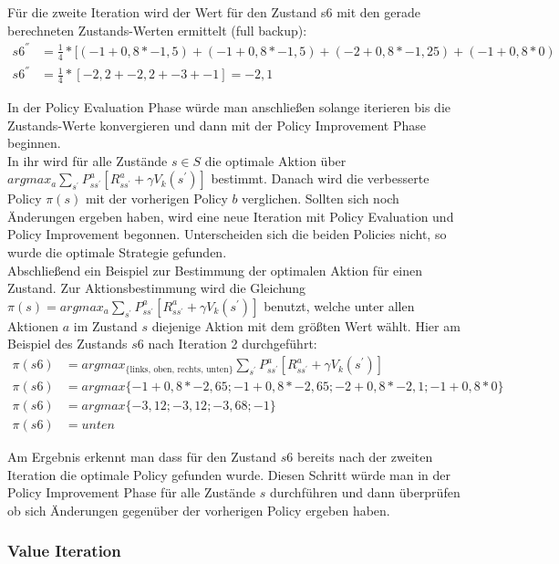 \documentclass[10pt]{scrartcl}
\begin{document}
Für die zweite Iteration wird der Wert für den Zustand s6 mit den gerade berechneten Zustands-Werten ermittelt (full backup):
\begin{align}
	s6^{''} &= \frac{1}{4} * [(-1 + 0,8 * -1,5) + (-1 + 0,8 * -1,5) + (-2 + 0,8 * -1,25) + (-1 + 0,8 * 0)\\
	s6^{''} &= \frac{1}{4} * [ -2,2 + -2,2 + -3 + -1 ] = -2,1
\end{align}

In der Policy Evaluation Phase würde man anschließen solange iterieren bis die Zustands-Werte konvergieren und dann mit der Policy Improvement Phase beginnen.\\
In ihr wird für alle Zustände $s \in S$ die optimale Aktion über 
$argmax_{a} \sum_{s^{'}} P^a_{ss^{'}} [R^a_{ss^{'}} + \gamma V_{k} (s^{'})]$ bestimmt. 
Danach wird die verbesserte Policy $\pi(s)$ mit der vorherigen Policy $b$ verglichen.
Sollten sich noch Änderungen ergeben haben, wird eine neue Iteration mit Policy Evaluation und Policy Improvement begonnen.
Unterscheiden sich die beiden Policies nicht, so wurde die optimale Strategie gefunden.\\

Abschließend ein Beispiel zur Bestimmung der optimalen Aktion für einen Zustand. Zur Aktionsbestimmung wird die Gleichung $\pi(s) = argmax_{a} \sum_{s^{'}} P^a_{ss^{'}} [R^a_{ss^{'}} + \gamma V_{k} (s^{'})]$ benutzt, welche unter allen Aktionen $a$ im Zustand $s$ diejenige Aktion mit dem größten Wert wählt. Hier am Beispiel des Zustands $s6$ nach Iteration 2 durchgeführt:
\begin{align}
	\pi(s6) &= argmax_{\text{\{links, oben, rechts, unten\}}} \sum_{s^{'}} P^a_{ss^{'}} [R^a_{ss^{'}} + \gamma V_{k} (s^{'})]\\	
	\pi(s6) &= argmax \{ -1 + 0,8 * -2,65; -1 + 0,8 * -2,65; -2 + 0,8 * -2,1; -1 + 0,8 * 0 \}\\
	\pi(s6) &= argmax \{ -3,12; -3,12; -3,68; -1 \}\\
	\pi(s6) &= unten
\end{align}

Am Ergebnis erkennt man dass für den Zustand $s6$ bereits nach der zweiten Iteration die optimale Policy gefunden wurde.
Diesen Schritt würde man in der Policy Improvement Phase für alle Zustände $s$ durchführen und dann überprüfen ob sich Änderungen gegenüber der vorherigen Policy ergeben haben.

\subsubsection{Value Iteration}
\label{sec:anwendung_value_iteration}
\end{document}
